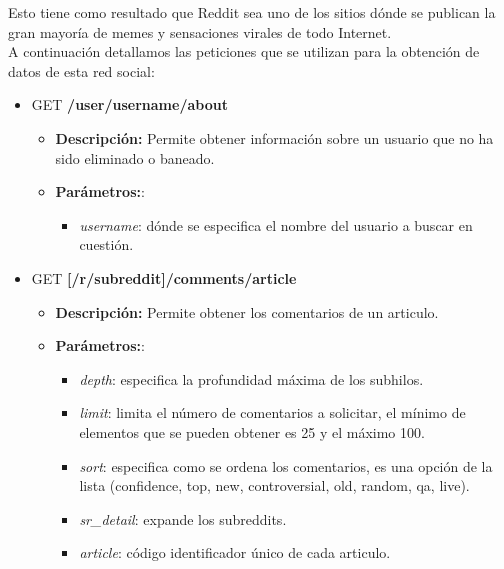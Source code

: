 \documentclass[../../main.tex]{subfiles}
\begin{document}
Esto tiene como resultado que Reddit sea uno de los sitios dónde se publican la gran mayoría de memes y sensaciones virales de todo Internet.\\

A continuación detallamos las peticiones que se utilizan para la obtención de datos de esta red social:

\begin{itemize}

    \item GET \textbf{/user/username/about}
    \begin{itemize}
        \item \textbf{Descripción:} Permite obtener información sobre un usuario que no ha sido eliminado o baneado.
        \item \textbf{Parámetros:}:
        \begin{itemize}
            \item  \textit{username}: dónde se especifica el nombre del usuario a buscar en cuestión.
        \end{itemize}
    \end{itemize}
    
    \item GET \textbf{[/r/subreddit]/comments/article}
    \begin{itemize}
        \item \textbf{Descripción:} Permite obtener los comentarios de un articulo.
        \item \textbf{Parámetros:}:
        \begin{itemize}
            \item  \textit{depth}: especifica la profundidad máxima de los subhilos.
            
            \item  \textit{limit}: limita el número de comentarios a solicitar, el mínimo de elementos que se pueden obtener es 25 y el máximo 100.
            
            \item  \textit{sort}: especifica como se ordena los comentarios, es una opción de la lista (confidence, top, new, controversial, old, random, qa, live).
            
            \item  \textit{sr\_detail}: expande los subreddits.
            
            \item  \textit{article}: código identificador único de cada articulo.
            

\end{itemize}
\end{itemize}
\end{itemize}
\end{document}
